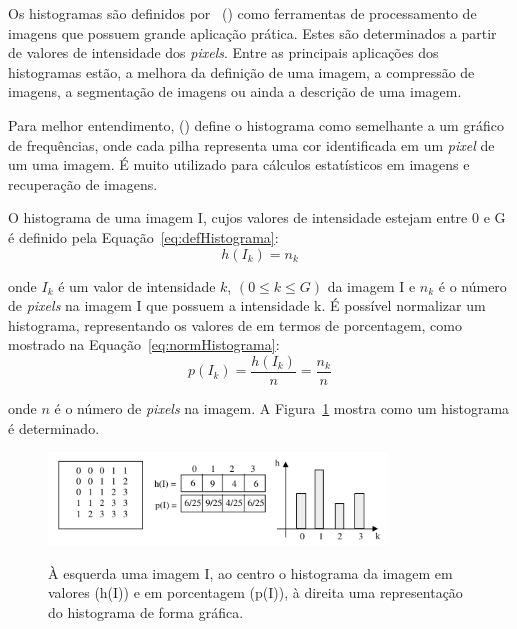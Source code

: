 Os histogramas são definidos por~\citeauthor{marengoni2009tutorial} (\citeyear{marengoni2009tutorial}) como ferramentas de processamento de imagens que possuem grande aplicação prática. Estes são determinados a partir de valores de intensidade dos \textit{pixels}. Entre as principais aplicações dos histogramas estão, a melhora da definição de uma imagem, a compressão de imagens, a segmentação de imagens ou ainda a descrição de uma imagem.

Para melhor entendimento, \citeauthor{hoshiro2008processamento} (\citeyear{hoshiro2008processamento}) define o histograma como semelhante a um gráfico de frequências, onde cada pilha representa uma cor identificada em um \textit{pixel} de um uma imagem. É muito utilizado para cálculos estatísticos em imagens e recuperação de imagens.

O histograma de uma imagem I, cujos valores de intensidade estejam entre 0 e G é definido pela Equação~\ref{eq:defHistograma}:
\begin{equation}
\label{eq:defHistograma}
    h(I_k) = n_k
\end{equation}

onde $I_k$ é um valor de intensidade $k$, $(0\leq k\leq G)$ da imagem I e $n_k$ é o número de \textit{pixels} na imagem I que possuem a intensidade k. É possível normalizar um histograma, representando os valores de em termos de porcentagem, como mostrado na Equação~\ref{eq:normHistograma}:
\begin{equation}
\label{eq:normHistograma}
    p(I_k) = \frac{h(I_k)}{n} = \frac{n_k}{n}
\end{equation}

onde $n$ é o número de \textit{pixels} na imagem. A Figura~\ref{fig:modeloHistrograma} mostra como um histograma é determinado.

\begin{figure}[!hbtp]
  \centering
   \caption{À esquerda uma imagem I, ao centro o histograma da imagem em valores (h(I)) e em porcentagem (p(I)), à direita uma representação do histograma de forma gráfica.}
    \includegraphics[width = 0.8\textwidth]{Caps/Figs/ref-teorico/histogram.png}
   \label{fig:modeloHistrograma}
\end{figure}


